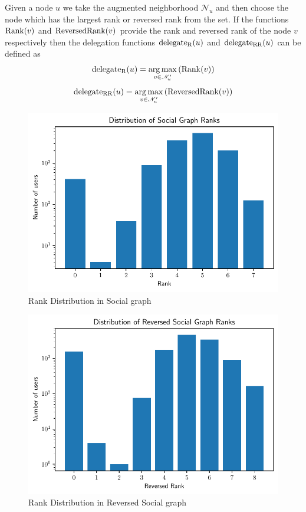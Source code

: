 Given a node $u$ we take the augmented neighborhood $\mathcal{N}_u$ and then choose the node which has the largest rank or reversed rank from the set. If the functions $\operatorname*{Rank}(v)$ and $\operatorname*{ReversedRank}(v)$ provide the rank and reversed rank of the node $v$ respectively then the delegation functions $\operatorname*{delegate_R}(u)$ and $\operatorname*{delegate_{RR}}(u)$ can be defined as 
\[\operatorname*{delegate_R}(u)  = \operatorname*{arg\,max}_{v \in \mathcal{N}_u^\prime} \left(\operatorname*{Rank}(v) \right)\]
\[\operatorname*{delegate_{RR}}(u)  = \operatorname*{arg\,max}_{v \in \mathcal{N}_u^\prime} \left(\operatorname*{ReversedRank}(v) \right)\]

\begin{figure}[!ht]
    \centering
    \includegraphics[width=\linewidth]{images/Rank dist.pdf}
    \caption{Rank Distribution in Social graph}
    \label{fig:rank}
\end{figure}
\begin{figure}[!ht]
    \centering
    \includegraphics[width=\linewidth]{images/Reversed Rank dist.pdf}
    \caption{Rank Distribution in Reversed Social graph}
    \label{fig:reversed-rank}
\end{figure}

